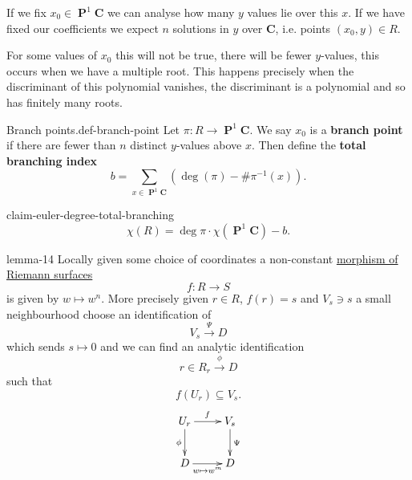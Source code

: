 \documentclass[10pt,]{book}
\newcommand{\terminology}[1]{\textbf{#1}}
\numberwithin{equation}{section}
\newcommand{\inv}{^{-1}}
\newcommand{\CC}{\mathbf{C}}
\DeclareMathOperator{\PP}{\mathbf{P}}
\begin{document}
If we fix \(x_0 \in \PP^1 \CC\) we can analyse how many \(y\) values lie over this \(x\). If we have fixed our coefficients we expect \(n\) solutions in \(y\) over \(\CC\), i.e. points \((x_0,y)\in R\).%
\par
\hypertarget{p-513}{}%
For some values of \(x_0\) this will not be true, there will be fewer \(y\)-values, this occurs when we have a multiple root. This happens precisely when the discriminant of this polynomial vanishes, the discriminant is a polynomial and so has finitely many roots.%
\begin{definition}{Branch points.}{def-branch-point}%
\hypertarget{p-514}{}%
Let \(\pi\colon R \to \PP^1 \CC\). We say \(x_0\) is a \terminology{branch point} if there are fewer than \(n\) distinct \(y\)-values above \(x\). Then define the \terminology{total branching index}%
\begin{equation*}
b = \sum_{x\in \PP^1 \CC} (\deg(\pi) - \# \pi\inv (x))\text{.}
\end{equation*}
%
\end{definition}
\begin{claim}{}{}{claim-euler-degree-total-branching}%
\hypertarget{p-515}{}%
%
\begin{equation*}
\chi(R) = \deg \pi \cdot \chi(\PP^1\CC)  - b\text{.}
\end{equation*}
%
\end{claim}
\begin{lemma}{}{}{lemma-14}%
\hypertarget{p-516}{}%
Locally given some choice of coordinates a non-constant \hyperref[def-morph-riem-surf]{morphism of Riemann surfaces}%
\begin{equation*}
f\colon R \to S
\end{equation*}
is given by \(w\mapsto w^n\). More precisely given \(r \in R\), \(f(r) = s\) and \(V_s \ni s\) a small neighbourhood choose an identification of%
\begin{equation*}
V_s \xrightarrow \Psi D
\end{equation*}
which sends \(s \mapsto 0\) and we can find an analytic identification%
\begin{equation*}
r\in R_r \xrightarrow \phi D
\end{equation*}
such that%
\begin{equation*}
f(U_r) \subseteq V_s\text{.}
\end{equation*}
%
\begin{equation*}
\xymatrix{U_r \ar[r]^f \ar[d]_\phi & V_s \ar[d]^\Psi \\ D \ar[r]_{w\mapsto w^m} & D}
\end{equation*}
%
\end{lemma}
\end{document}
